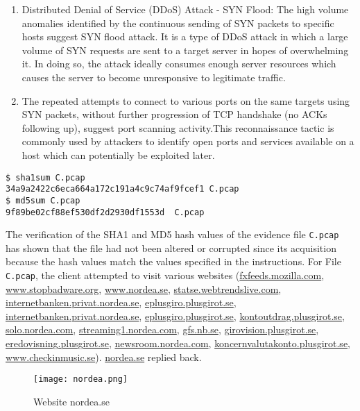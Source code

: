 \begin{enumerate}
	\item Distributed Denial of Service (DDoS) Attack - SYN Flood: The high volume anomalies identified by the continuous sending of SYN packets to specific hosts suggest SYN flood attack. It is a type of DDoS attack in which a large volume of SYN requests are sent to a target server in hopes of overwhelming it. In doing so, the attack ideally consumes enough server resources which causes the server to become unresponsive to legitimate traffic.
	\item The repeated attempts to connect to various ports on the same targets using SYN packets, without further progression of TCP handshake (no ACKs following up), suggest port scanning activity.This reconnaissance tactic is commonly used by attackers to identify open ports and services available on a host which can potentially be exploited later.
\end{enumerate}

\begin{verbatim}
$ sha1sum C.pcap             
34a9a2422c6eca664a172c191a4c9c74af9fcef1 C.pcap
$ md5sum C.pcap 
9f89be02cf88ef530df2d2930df1553d  C.pcap
\end{verbatim}
The verification of the SHA1 and MD5 hash values of the evidence file \texttt{C.pcap} has shown that the file had not been altered or corrupted since its acquisition because the hash values match the values specified in the instructions. For File \texttt{C.pcap}, the client attempted to visit various websites (\url{fxfeeds.mozilla.com}, \url{www.stopbadware.org}, \url{www.nordea.se}, \url{statse.webtrendslive.com}, \url{internetbanken.privat.nordea.se}, \url{eplusgiro.plusgirot.se}, \url{internetbanken.privat.nordea.se}, \url{eplusgiro.plusgirot.se}, \url{kontoutdrag.plusgirot.se}, \url{solo.nordea.com}, \url{streaming1.nordea.com}, \url{gfs.nb.se}, \url{girovision.plusgirot.se}, \url{eredovisning.plusgirot.se}, \url{newsroom.nordea.com}, \url{koncernvalutakonto.plusgirot.se}, \url{www.checkinmusic.se}). \url{nordea.se} replied back.
\begin{figure}[h]
\texttt{[image: nordea.png]}
\centering
\caption{Website nordea.se}
\label{screen:nordea}
\end{figure}

